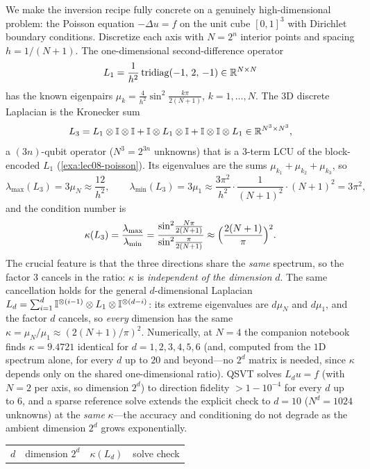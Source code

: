 \begin{example}
\label{exa:lec09-poisson}
We make the inversion recipe fully concrete on a genuinely high-dimensional problem:
the Poisson equation $-\Delta u=f$ on the unit cube $[0,1]^3$ with Dirichlet boundary
conditions. Discretize each axis with $N=2^n$ interior points and spacing
$h=1/(N{+}1)$. The one-dimensional second-difference operator
\[
  L_1=\frac{1}{h^2}\,\mathrm{tridiag}(-1,\,2,\,-1)\in\mathbb{R}^{N\times N}
\]
has the known eigenpairs $\mu_k=\tfrac{4}{h^2}\sin^2\!\tfrac{k\pi}{2(N+1)}$,
$k=1,\dots,N$. The $3$D discrete Laplacian is the Kronecker sum
\[
  L_3=L_1\otimes\mathbb{I}\otimes\mathbb{I}+\mathbb{I}\otimes L_1\otimes\mathbb{I}+\mathbb{I}\otimes\mathbb{I}\otimes L_1
  \in\mathbb{R}^{N^3\times N^3},
\]
a $(3n)$-qubit operator ($N^3=2^{3n}$ unknowns) that is a $3$-term LCU of the
block-encoded $L_1$ (\cref{exa:lec08-poisson}). Its eigenvalues are the sums
$\mu_{k_1}+\mu_{k_2}+\mu_{k_3}$, so
\[
  \lambda_{\max}(L_3)=3\mu_N\approx \frac{12}{h^2},\qquad
  \lambda_{\min}(L_3)=3\mu_1\approx \frac{3\pi^2}{h^2}\cdot\frac{1}{(N+1)^2}\cdot(N+1)^2
   =3\pi^2,
\]
and the condition number is
\[
  \kappa(L_3)=\frac{\lambda_{\max}}{\lambda_{\min}}
  =\frac{\sin^2\!\frac{N\pi}{2(N+1)}}{\sin^2\!\frac{\pi}{2(N+1)}}
  \approx\Bigl(\frac{2(N+1)}{\pi}\Bigr)^2.
\]
The crucial feature is that the three directions share the \emph{same} spectrum, so
the factor $3$ cancels in the ratio: $\kappa$ is \emph{independent of the dimension}
$d$. The same cancellation holds for the general $d$-dimensional Laplacian
$L_d=\sum_{i=1}^{d}\mathbb{I}^{\otimes(i-1)}\otimes L_1\otimes\mathbb{I}^{\otimes(d-i)}$: its extreme
eigenvalues are $d\mu_N$ and $d\mu_1$, and the factor $d$ cancels, so
\emph{every} dimension has the same $\kappa=\mu_N/\mu_1\approx(2(N{+}1)/\pi)^2$.
Numerically, at $N=4$ the companion notebook finds $\kappa=9.4721$ identical for
$d=1,2,3,4,5,6$ (and, computed from the $1$D spectrum alone, for every $d$ up to
$20$ and beyond---no $2^d$ matrix is needed, since $\kappa$ depends only on the shared
one-dimensional ratio). QSVT solves $L_d u=f$ (with $N=2$ per axis, so dimension
$2^d$) to direction fidelity $>1-10^{-4}$ for every $d$ up to $6$, and a sparse
reference solve extends the explicit check to $d=10$ ($N^d=1024$ unknowns) at the
\emph{same} $\kappa$---the accuracy and conditioning do not degrade as the ambient
dimension $2^d$ grows exponentially.
\begin{center}
\begin{tabular}{r r r l}
\toprule
$d$ & dimension $2^d$ & $\kappa(L_d)$ & solve check\\

\end{tabular}
\end{center}
\end{example}
